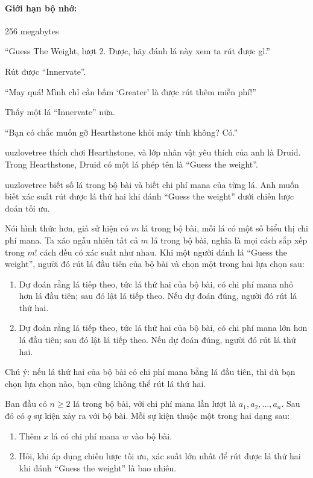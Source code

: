 \documentclass[11pt]{article}
\begin{document}
\paragraph{Giới hạn bộ nhớ:} 256 megabytes

``Guess The Weight, lượt 2. Được, hãy đánh lá này xem ta rút được gì.''

Rút được ``Innervate''.

``May quá! Mình chỉ cần bấm `Greater' là được rút thêm miễn phí!''

Thấy một lá ``Innervate'' nữa.

``Bạn có chắc muốn gỡ Hearthstone khỏi máy tính không? Có.''

uuzlovetree thích chơi Hearthstone, và lớp nhân vật yêu thích của anh là
Druid. Trong Hearthstone, Druid có một lá phép tên là ``Guess the weight''.

uuzlovetree biết số lá trong bộ bài và biết chi phí mana của từng lá. Anh
muốn biết xác suất rút được lá thứ hai khi đánh ``Guess the weight'' dưới
chiến lược đoán tối ưu.

Nói hình thức hơn, giả sử hiện có \(m\) lá trong bộ bài, mỗi lá có một số biểu
thị chi phí mana. Ta xáo ngẫu nhiên tất cả \(m\) lá trong bộ bài, nghĩa là mọi
cách sắp xếp trong \(m!\) cách đều có xác suất như nhau. Khi một người đánh
lá ``Guess the weight'', người đó rút lá đầu tiên của bộ bài và chọn một trong
hai lựa chọn sau:
\begin{enumerate}
  \item Dự đoán rằng lá tiếp theo, tức lá thứ hai của bộ bài, có chi phí mana
  nhỏ hơn lá đầu tiên; sau đó lật lá tiếp theo. Nếu dự đoán đúng, người đó rút
  lá thứ hai.
  \item Dự đoán rằng lá tiếp theo, tức lá thứ hai của bộ bài, có chi phí mana
  lớn hơn lá đầu tiên; sau đó lật lá tiếp theo. Nếu dự đoán đúng, người đó rút
  lá thứ hai.
\end{enumerate}

Chú ý: nếu lá thứ hai của bộ bài có chi phí mana bằng lá đầu tiên, thì dù bạn
chọn lựa chọn nào, bạn cũng không thể rút lá thứ hai.

Ban đầu có \(n\ge 2\) lá trong bộ bài, với chi phí mana lần lượt là
\(a_1,a_2,\ldots,a_n\). Sau đó có \(q\) sự kiện xảy ra với bộ bài. Mỗi sự
kiện thuộc một trong hai dạng sau:
\begin{enumerate}
  \item Thêm \(x\) lá có chi phí mana \(w\) vào bộ bài.
  \item Hỏi, khi áp dụng chiến lược tối ưu, xác suất lớn nhất để rút được lá
  thứ hai khi đánh ``Guess the weight'' là bao nhiêu.
\end{enumerate}
\end{document}
